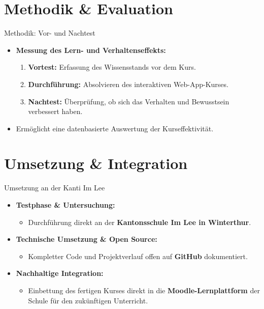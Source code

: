 \documentclass[aspectratio=169]{beamer}
\begin{document}
\section{Methodik \& Evaluation}
\begin{frame}{Methodik: Vor- und Nachtest}
    \begin{itemize}
        \item \textbf{Messung des Lern- und Verhaltenseffekts:}
        \begin{enumerate}
            \item \textbf{Vortest:} Erfassung des Wissensstands vor dem Kurs.
            \item \textbf{Durchführung:} Absolvieren des interaktiven Web-App-Kurses.
            \item \textbf{Nachtest:} Überprüfung, ob sich das Verhalten und Bewusstsein verbessert haben.
        \end{enumerate}
        \item Ermöglicht eine datenbasierte Auswertung der Kurseffektivität.
    \end{itemize}
\end{frame}

\section{Umsetzung \& Integration}
\begin{frame}{Umsetzung an der Kanti Im Lee}
    \begin{itemize}
        \item \textbf{Testphase \& Untersuchung:} 
        \begin{itemize}
            \item Durchführung direkt an der \textbf{Kantonsschule Im Lee in Winterthur}.
        \end{itemize}
        \item \textbf{Technische Umsetzung \& Open Source:}
        \begin{itemize}
            \item Kompletter Code und Projektverlauf offen auf \textbf{GitHub} dokumentiert.
        \end{itemize}
        \item \textbf{Nachhaltige Integration:}
        \begin{itemize}
            \item Einbettung des fertigen Kurses direkt in die \textbf{Moodle-Lernplattform} der Schule für den zukünftigen Unterricht.
        \end{itemize}
    \end{itemize}
\end{frame}
\end{document}
